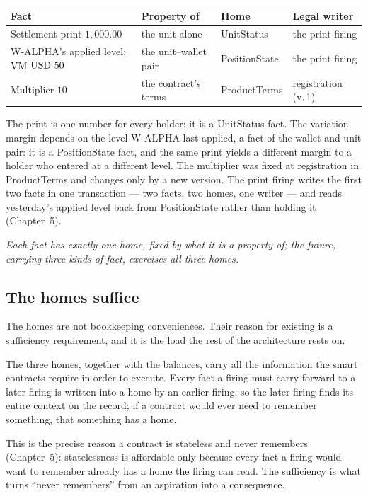 \begin{center}
\begin{tabular}{llll}
\toprule
Fact & Property of & Home & Legal writer \\
\midrule
Settlement print $1{,}000.00$        & the unit alone         & UnitStatus    & the print firing \\
W-ALPHA's applied level; VM $\mbox{USD~50}$ & the unit--wallet pair & PositionState & the print firing \\
Multiplier $10$                      & the contract's terms   & ProductTerms  & registration (v.\,1) \\
\bottomrule
\end{tabular}
\end{center}

The print is one number for every holder: it is a UnitStatus fact. The variation margin
depends on the level W-ALPHA last applied, a fact of the wallet-and-unit pair: it is a
PositionState fact, and the same print yields a different margin to a holder who entered
at a different level. The multiplier was fixed at registration in ProductTerms and changes
only by a new version. The print firing writes the first two facts in one transaction ---
two facts, two homes, one writer --- and reads yesterday's applied level back from
PositionState rather than holding it (Chapter~5).

\emph{Each fact has exactly one home, fixed by what it is a property of; the future,
carrying three kinds of fact, exercises all three homes.}

\subsection{The homes suffice}

The homes are not bookkeeping conveniences. Their reason for existing is a sufficiency
requirement, and it is the load the rest of the architecture rests on.

\begin{principle}\label{prin:sufficiency}
The three homes, together with the balances, carry all the information the smart contracts
require in order to execute. Every fact a firing must carry forward to a later firing is
written into a home by an earlier firing, so the later firing finds its entire context on
the record; if a contract would ever need to remember something, that something has a
home.
\end{principle}

This is the precise reason a contract is stateless and never remembers
(Chapter~5): statelessness is affordable only because every fact a firing
would want to remember already has a home the firing can read. The sufficiency is what
turns ``never remembers'' from an aspiration into a consequence.

